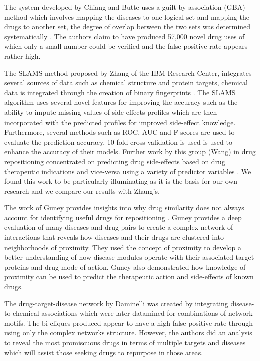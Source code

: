 \documentclass[preprint,11pt]{elsarticle}
\begin{document}
The system developed by Chiang and Butte uses a guilt by association (GBA) method which involves mapping the diseases to one logical set and mapping the drugs to another set, the degree of overlap between the two sets was determined systematically  \cite{Chiang2009}. The authors claim to have produced 57,000 novel drug uses of which only a small number could be verified and the false positive rate appears rather high. 

The SLAMS method proposed by Zhang of the IBM Research Center, integrates several sources of data such as chemical structure and protein targets, chemical data is integrated through the creation of binary fingerprints \cite{Zhang2013,Zhang2014}. The SLAMS algorithm uses several novel features for improving the accuracy such as the ability to impute missing values of side-effects profiles which are then incorporated with the predicted profiles for improved side-effect knowledge. Furthermore, several methods such as ROC, AUC and F-scores are used to evaluate the prediction accuracy, 10-fold cross-validation is used is used to enhance the accuracy of their models. Further work by this group (Wang) in drug repositioning concentrated on predicting drug side-effects based on drug therapeutic indications and vice-versa using a variety of predictor variables \cite{FWang2014}. We found this work to be particularly illuminating as it is the basis for our own research and we compare our results with Zhang's. 

The work of Guney provides insights into why drug similarity does not always account for identifying useful drugs for repositioning \cite{Guney2016a,Guney2017}. Guney provides a deep evaluation of many diseases and drug pairs to create a complex network of interactions that reveals how diseases and their drugs are clustered into neighborhoods of proximity. They used the concept of proximity to develop a better understanding of how disease  modules operate with their associated target proteins and drug mode of action. Guney also demonstrated how knowledge of  proximity can be used to predict the therapeutic action and side-effects of known drugs.

The drug-target-disease network by Daminelli \cite{Daminelli2012} was created by integrating disease-to-chemical associations which were later datamined for combinations of network motifs. The bi-cliques produced appear to have a high false positive rate through using only the complex networks structure. However, the authors did an analysis to reveal the most promiscuous drugs in terms of multiple targets and diseases which will assist those seeking drugs to repurpose in those areas.
 
\end{document}
